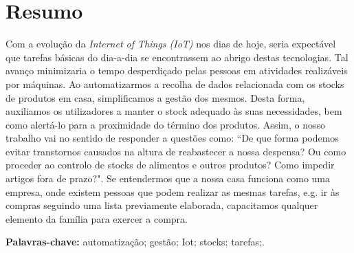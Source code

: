\cleardoublepage\newpage
\chapter*{Resumo} \label{resumo}

Com a evolução da \textit{Internet of Things (IoT)} nos dias de hoje, seria expectável que tarefas básicas do dia-a-dia se encontrassem ao abrigo destas tecnologias. Tal avanço minimizaria o tempo desperdiçado pelas pessoas em atividades realizáveis por máquinas. Ao automatizarmos a recolha de dados relacionada com os stocks de produtos em casa, simplificamos a gestão dos mesmos. Desta forma, auxiliamos os utilizadores a manter o stock adequado às suas necessidades, bem como alertá-lo para a proximidade do término dos produtos. Assim, o nosso trabalho vai no sentido de responder a questões como: ``De que forma podemos evitar transtornos causados na altura de reabastecer a nossa despensa? Ou como proceder ao controlo de stocks de alimentos e outros produtos? Como impedir artigos fora de prazo?". Se entendermos que a nossa casa funciona como uma empresa, onde existem pessoas que podem realizar as mesmas tarefas, e.g. ir às compras seguindo uma lista previamente elaborada, capacitamos qualquer elemento da família para exercer a compra.

\vspace{0.2cm}
{\bf Palavras-chave:} automatização; gestão; Iot; stocks; tarefas;.
